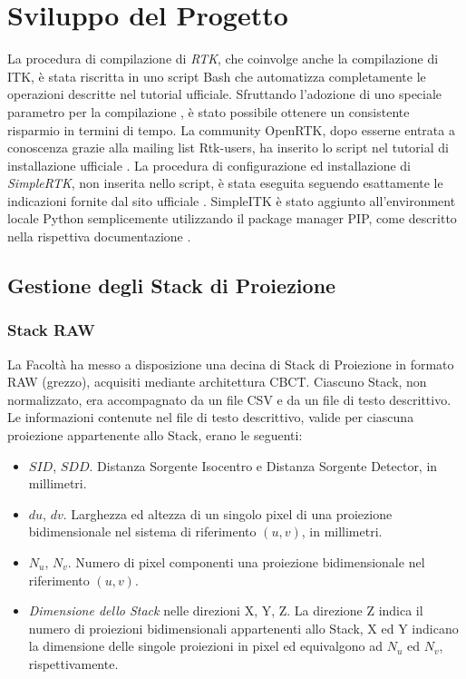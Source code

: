 \documentclass[a4paper,12pt, doubleside]{report}
\begin{document}
                                              
    \chapter{Sviluppo del Progetto}
        \par
            La procedura di compilazione di \textit{RTK}, che coinvolge anche la compilazione di ITK, è stata riscritta in uno script Bash \cite{script-bash} che automatizza completamente le operazioni descritte nel tutorial ufficiale. Sfruttando l'adozione di uno speciale parametro per la compilazione \cite{parallel-j}, è stato possibile ottenere un consistente risparmio in termini di tempo. La community OpenRTK, dopo esserne entrata a conoscenza grazie alla mailing list Rtk-users, ha inserito lo script nel tutorial di installazione ufficiale \cite{wiki-rtk}. La procedura di configurazione ed installazione di \textit{SimpleRTK}, non inserita nello script, è stata eseguita seguendo esattamente le indicazioni fornite dal sito ufficiale \cite{simplertk-install}. SimpleITK è stato aggiunto all'environment locale Python semplicemente utilizzando il package manager PIP, come descritto nella rispettiva documentazione \cite{simpleitk-install}.


        \section{Gestione degli Stack di Proiezione}
            \subsection{Stack RAW}
                \par
                    La Facoltà ha messo a disposizione una decina di Stack di Proiezione in formato RAW (grezzo), acquisiti mediante architettura CBCT. Ciascuno Stack, non normalizzato, era accompagnato da un file CSV e da un file di testo descrittivo. Le informazioni contenute nel file di testo descrittivo, valide per ciascuna proiezione appartenente allo Stack, erano le seguenti:
                    
                    \begin{itemize}
                        \item $SID$, $SDD$. Distanza Sorgente Isocentro e Distanza Sorgente Detector, in millimetri.
                        \item $du$, $dv$. Larghezza ed altezza di un singolo pixel di una proiezione bidimensionale nel sistema di riferimento $(u,v)$, in millimetri.
                        \item $N_u$, $N_v$. Numero di pixel componenti una proiezione bidimensionale nel riferimento $(u,v)$.
                        \item \textit{Dimensione dello Stack} nelle direzioni X, Y, Z. La direzione Z indica il numero di proiezioni bidimensionali appartenenti allo Stack, X ed Y indicano la dimensione delle singole proiezioni in pixel ed equivalgono ad $N_u$ ed $N_v$, rispettivamente.
                    \end{itemize}
                    
\end{document}
